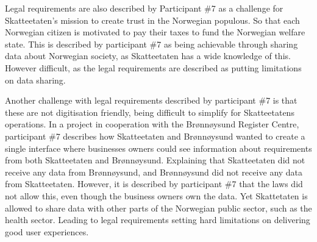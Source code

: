 Legal requirements are also described by Participant \#7 as a challenge for Skatteetaten's mission to create trust in the Norwegian populous. So that each Norwegian citizen is motivated to pay their taxes to fund the Norwegian welfare state. This is described by participant \#7 as being achievable through sharing data about Norwegian society, as Skatteetaten has a wide knowledge of this. However difficult, as the legal requirements are described as putting limitations on data sharing.


Another challenge with legal requirements described by participant \#7 is that these are not digitisation friendly, being difficult to simplify for Skatteetatens operations. In a project in cooperation with the Brønnøysund Register Centre, participant \#7 describes how Skatteetaten and Brønnøysund wanted to create a single interface where businesses owners could see information about requirements from both Skatteetaten and Brønnøysund. Explaining that Skatteetaten did not receive any data from Brønnøysund, and Brønnøysund did not receive any data from Skatteetaten. However, it is described by participant \#7 that the laws did not allow this, even though the business owners own the data. Yet Skattetaten is allowed to share data with other parts of the Norwegian public sector, such as the health sector. Leading to legal requirements setting hard limitations on delivering good user experiences.


